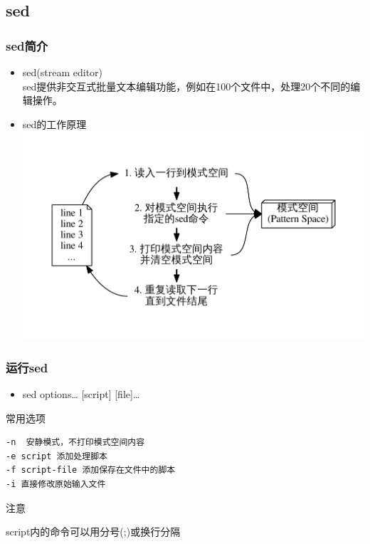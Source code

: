 \documentclass[xcolor=svgnames,presentation]{beamer}
\begin{document}
\subsection{sed}
\label{sec-2-1}
\begin{frame}
\frametitle{sed简介}
\label{sec-2-1-1}
\begin{itemize}

\item sed(stream editor)\\
\label{sec-2-1-1-1}%
sed提供非交互式批量文本编辑功能，例如在100个文件中，处理20个不同的编辑操作。

\item sed的工作原理\\
\label{sec-2-1-1-2}%
\includegraphics[width=.9\linewidth]{img/sed.pdf}
\end{itemize} %
\end{frame}
\begin{frame}[fragile]
\frametitle{运行sed}
\label{sec-2-1-2}
\begin{itemize}

\item sed options\ldots{} [script] [file]\ldots{}
\label{sec-2-1-2-1}%
\end{itemize} %
\begin{exampleblock}{常用选项}
\label{sec-2-1-2-2}


\begin{verbatim}
-n  安静模式，不打印模式空间内容
-e script 添加处理脚本
-f script-file 添加保存在文件中的脚本
-i 直接修改原始输入文件
\end{verbatim}
\end{exampleblock}
\begin{block}{注意}
\label{sec-2-1-2-3}

script内的命令可以用分号(;)或换行分隔
\end{block}
\end{frame}
\end{document}
